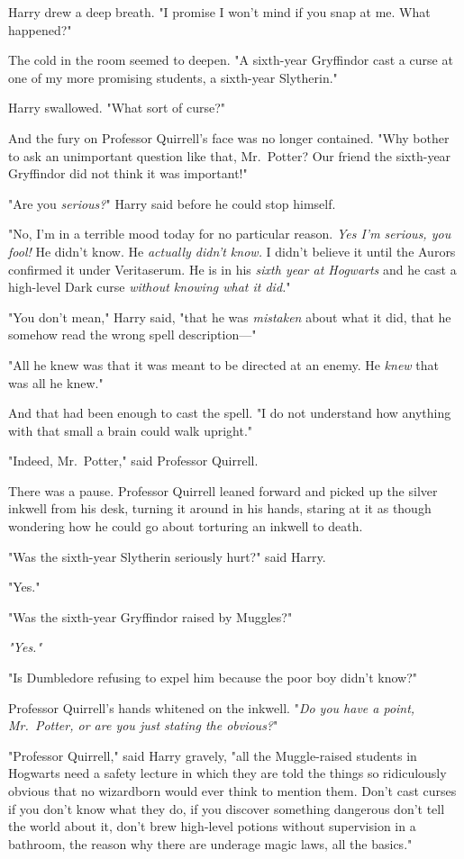 Harry drew a deep breath. "I promise I won't mind if you snap at me. What
happened?"

The cold in the room seemed to deepen. "A sixth-year Gryffindor cast a curse at
one of my more promising students, a sixth-year Slytherin."

Harry swallowed. "What{\el} sort of curse?"

And the fury on Professor Quirrell's face was no longer contained. "Why bother
to ask an unimportant question like that, Mr.~Potter? Our friend the sixth-year
Gryffindor did not think it was important!"

"Are you \emph{serious?}" Harry said before he could stop himself.

"No, I'm in a terrible mood today for no particular reason. \emph{Yes I'm
serious, you fool!} He didn't know. He \emph{actually didn't know.} I didn't
believe it until the Aurors confirmed it under Veritaserum. He is in his
\emph{sixth year at Hogwarts} and he cast a high-level Dark curse \emph{without
knowing what it did.}"

"You don't mean," Harry said, "that he was \emph{mistaken} about what it did,
that he somehow read the wrong spell description\mbox{---}"

"All he knew was that it was meant to be directed at an enemy. He \emph{knew}
that was all he knew."

And that had been enough to cast the spell. "I do not understand how anything
with that small a brain could walk upright."

"Indeed, Mr.~Potter," said Professor Quirrell.

There was a pause. Professor Quirrell leaned forward and picked up the silver
inkwell from his desk, turning it around in his hands, staring at it as though
wondering how he could go about torturing an inkwell to death.

"Was the sixth-year Slytherin seriously hurt?" said Harry.

"Yes."

"Was the sixth-year Gryffindor raised by Muggles?"

\emph{"Yes."}

"Is Dumbledore refusing to expel him because the poor boy didn't know?"

Professor Quirrell's hands whitened on the inkwell. "\emph{Do you have a point,
Mr.~Potter, or are you just stating the obvious?}"

"Professor Quirrell," said Harry gravely, "all the Muggle-raised students in
Hogwarts need a safety lecture in which they are told the things so
ridiculously obvious that no wizardborn would ever think to mention them. Don't
cast curses if you don't know what they do, if you discover something dangerous
don't tell the world about it, don't brew high-level potions without
supervision in a bathroom, the reason why there are underage magic laws, all
the basics."

